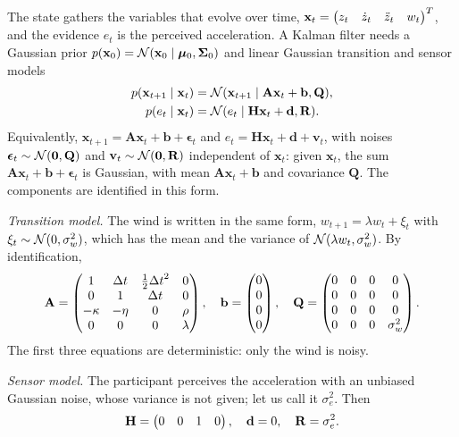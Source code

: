 \documentclass[11pt, a4paper]{exam}
\begin{document}
\begin{exercises}
\begin{parts}
    \begin{solution}
        The state gathers the variables that evolve over time, $\mathbf{x}_t = \begin{pmatrix}z_t & \dot{z}_t & \ddot{z}_t & w_t\end{pmatrix}^T$, and the evidence $e_t$ is the perceived acceleration. A Kalman filter needs a Gaussian prior $p(\mathbf{x}_0) = \mathcal{N}(\mathbf{x}_0 \mid \bm{\mu}_0, \bm{\Sigma}_0)$ and linear Gaussian transition and sensor models
        \begin{align*}
            p(\mathbf{x}_{t+1} \mid \mathbf{x}_t) & = \mathcal{N}(\mathbf{x}_{t+1} \mid \mathbf{A} \mathbf{x}_t + \mathbf{b}, \mathbf{Q}), \\
            p(e_t \mid \mathbf{x}_t) & = \mathcal{N}(e_t \mid \mathbf{H} \mathbf{x}_t + \mathbf{d}, \mathbf{R}).
        \end{align*}
        Equivalently, $\mathbf{x}_{t+1} = \mathbf{A} \mathbf{x}_t + \mathbf{b} + \bm{\epsilon}_t$ and $e_t = \mathbf{H} \mathbf{x}_t + \mathbf{d} + \mathbf{v}_t$, with noises $\bm{\epsilon}_t \sim \mathcal{N}(\mathbf{0}, \mathbf{Q})$ and $\mathbf{v}_t \sim \mathcal{N}(\mathbf{0}, \mathbf{R})$ independent of $\mathbf{x}_t$: given $\mathbf{x}_t$, the sum $\mathbf{A} \mathbf{x}_t + \mathbf{b} + \bm{\epsilon}_t$ is Gaussian, with mean $\mathbf{A} \mathbf{x}_t + \mathbf{b}$ and covariance $\mathbf{Q}$. The components are identified in this form.

        \emph{Transition model.} The wind is written in the same form, $w_{t+1} = \lambda w_t + \xi_t$ with $\xi_t \sim \mathcal{N}(0, \sigma_w^2)$, which has the mean and the variance of $\mathcal{N}(\lambda w_t, \sigma_w^2)$. By identification,
        \[
            \mathbf{A} = \begin{pmatrix}1 & \Delta t & \frac{1}{2} {\Delta t}^2 & 0 \\ 0 & 1 & \Delta t & 0 \\ -\kappa & -\eta & 0 & \rho \\ 0 & 0 & 0 & \lambda\end{pmatrix}, \quad
            \mathbf{b} = \begin{pmatrix}0 \\ 0 \\ 0 \\ 0\end{pmatrix}, \quad
            \mathbf{Q} = \begin{pmatrix}0 & 0 & 0 & 0 \\ 0 & 0 & 0 & 0 \\ 0 & 0 & 0 & 0 \\ 0 & 0 & 0 & \sigma_w^2\end{pmatrix}.
        \]
        The first three equations are deterministic: only the wind is noisy.

        \emph{Sensor model.} The participant perceives the acceleration with an unbiased Gaussian noise, whose variance is not given; let us call it $\sigma_e^2$. Then
        \[
            \mathbf{H} = \begin{pmatrix}0 & 0 & 1 & 0\end{pmatrix}, \quad \mathbf{d} = 0, \quad \mathbf{R} = \sigma_e^2.
        \]


\end{solution}
\end{parts}
\end{exercises}
\end{document}
